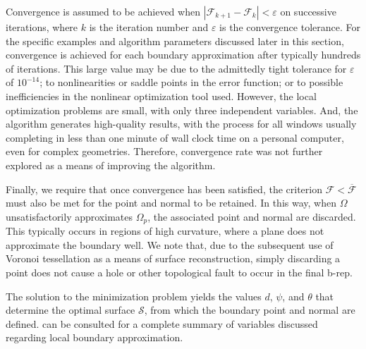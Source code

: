 Convergence is assumed to be achieved when $\left| \mathcal{F}_{k+1} - \mathcal{F}_{k}\right| < \varepsilon$ on successive iterations, where $k$ is the iteration number and  $\varepsilon$ is the convergence tolerance. For the specific examples and algorithm parameters discussed later in this section, convergence is achieved for each boundary approximation after typically hundreds of iterations. This large value may be due to the admittedly tight tolerance for $\varepsilon$ of $10^{-14}$; to nonlinearities or saddle points in the error function; or to possible inefficiencies in the nonlinear optimization tool used. However, the local optimization problems are small, with only three independent variables.  And, the algorithm generates high-quality results, with the process for all windows usually completing in less than one minute of wall clock time on a personal computer, even for complex geometries. Therefore, convergence rate was not further explored as a means of improving the algorithm.

Finally, we require that once convergence has been satisfied, the criterion $\mathcal{F} < \overline{\mathcal{F}}$ must also be met for the point and normal to be retained. In this way, when $\Omega$ unsatisfactorily approximates $\Omega_p$, the associated point and normal are discarded. This typically occurs in regions of high curvature, where a plane does not approximate the boundary well. We note that, due to the subsequent use of Voronoi tessellation as a means of surface reconstruction, simply discarding a point does not cause a hole or other topological fault to occur in the final b-rep.

The solution to the minimization problem yields the values $d$, $\psi$, and $\theta$ that determine the optimal surface $\mathcal{S}$, from which the boundary point and normal are defined.  can be consulted for a complete summary of variables discussed regarding local boundary approximation.

